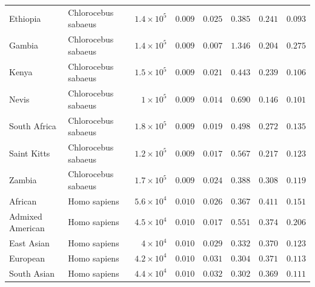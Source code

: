 \documentclass{article}
\begin{document}
\begin{center}
\begin{longtable*}{|l|l|r|r|r|r|r|r|}
             Ethiopia & Chlorocebus sabaeus & $1.4\times 10^{5}$ & $ 0.009$ & $ 0.025$ & $ 0.385$ & $ 0.241$ & $ 0.093$ \\
             Gambia & Chlorocebus sabaeus & $1.4\times 10^{5}$ & $ 0.009$ & $ 0.007$ & $ 1.346$ & $ 0.204$ & $ 0.275$ \\
             Kenya & Chlorocebus sabaeus & $1.5\times 10^{5}$ & $ 0.009$ & $ 0.021$ & $ 0.443$ & $ 0.239$ & $ 0.106$ \\
             Nevis & Chlorocebus sabaeus & $ 1\times 10^{5}$ & $ 0.009$ & $ 0.014$ & $ 0.690$ & $ 0.146$ & $ 0.101$ \\
             South Africa & Chlorocebus sabaeus & $1.8\times 10^{5}$ & $ 0.009$ & $ 0.019$ & $ 0.498$ & $ 0.272$ & $ 0.135$ \\
             Saint Kitts & Chlorocebus sabaeus & $1.2\times 10^{5}$ & $ 0.009$ & $ 0.017$ & $ 0.567$ & $ 0.217$ & $ 0.123$ \\
             Zambia & Chlorocebus sabaeus & $1.7\times 10^{5}$ & $ 0.009$ & $ 0.024$ & $ 0.388$ & $ 0.308$ & $ 0.119$ \\
            African & Homo sapiens & $5.6\times 10^{4}$ & $ 0.010$ & $ 0.026$ & $ 0.367$ & $ 0.411$ & $ 0.151$ \\
            Admixed American & Homo sapiens & $4.5\times 10^{4}$ & $ 0.010$ & $ 0.017$ & $ 0.551$ & $ 0.374$ & $ 0.206$ \\
            East Asian & Homo sapiens & $ 4\times 10^{4}$ & $ 0.010$ & $ 0.029$ & $ 0.332$ & $ 0.370$ & $ 0.123$ \\
            European & Homo sapiens & $4.2\times 10^{4}$ & $ 0.010$ & $ 0.031$ & $ 0.304$ & $ 0.371$ & $ 0.113$ \\
            South Asian & Homo sapiens & $4.4\times 10^{4}$ & $ 0.010$ & $ 0.032$ & $ 0.302$ & $ 0.369$ & $ 0.111$ \\
        \end{longtable*}
    \end{center}
\end{document}
